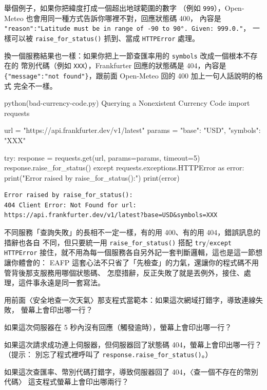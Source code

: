 舉個例子，如果你把緯度打成一個超出地球範圍的數字
（例如 \texttt{999}），Open-Meteo 也會用同一種方式告訴你哪裡不對，回應狀態碼 400，
內容是 \texttt{"reason":"Latitude must be in range of -90 to 90°. Given: 999.0."}，
一樣可以被 \texttt{raise\_for\_status()} 抓到、當成 \texttt{HTTPError} 處理。

換一個服務結果也一樣：如果你把上一節查匯率用的 \texttt{symbols} 改成一個根本不存在的
幣別代碼（例如 \texttt{XXX}），Frankfurter 回應的狀態碼是 404，內容是
\texttt{\{"message":"not found"\}}，跟前面 Open-Meteo 回的 400 加上一句人話說明的格式
完全不一樣。

\begin{example}{python}{(bad-currency-code.py) Querying a Nonexistent Currency Code}
import requests

url = "https://api.frankfurter.dev/v1/latest"
params = {"base": "USD", "symbols": "XXX"}

try:
    response = requests.get(url, params=params, timeout=5)
    response.raise_for_status()
except requests.exceptions.HTTPError as error:
    print("Error raised by raise_for_status():")
    print(error)
\end{example}

\begin{verbatim}
Error raised by raise_for_status():
404 Client Error: Not Found for url: https://api.frankfurter.dev/v1/latest?base=USD&symbols=XXX
\end{verbatim}

不同服務「查詢失敗」的長相不一定一樣，有的用 400、有的用 404，錯誤訊息的措辭也各自
不同，但只要統一用 \texttt{raise\_for\_status()} 搭配 \texttt{try}/\texttt{except
HTTPError} 接住，就不用為每一個服務各自另外記一套判斷邏輯，這也是這一節想讓你體會的：
EAFP 這套心法不只省了「先檢查」的力氣，還讓你的程式碼不用管背後那支服務用哪個狀態碼、
怎麼措辭，反正失敗了就是丟例外，接住、處理，這件事永遠是同一套寫法。

\begin{drills}[label=drills:eafp-requests]
\item 用前面〈安全地查一次天氣〉那支程式當範本：如果這次網域打錯字，導致連線失敗，
螢幕上會印出哪一行？
\item 如果這次伺服器在 5 秒內沒有回應（觸發逾時），螢幕上會印出哪一行？
\item 如果這次請求成功連上伺服器，但伺服器回了狀態碼 404，螢幕上會印出哪一行？（提示：
別忘了程式裡呼叫了 \texttt{response.raise\_for\_status()}。）
\item 如果這次查匯率、幣別代碼打錯字，導致伺服器回了 404，〈查一個不存在的幣別代碼〉
這支程式螢幕上會印出哪兩行？
\end{drills}

